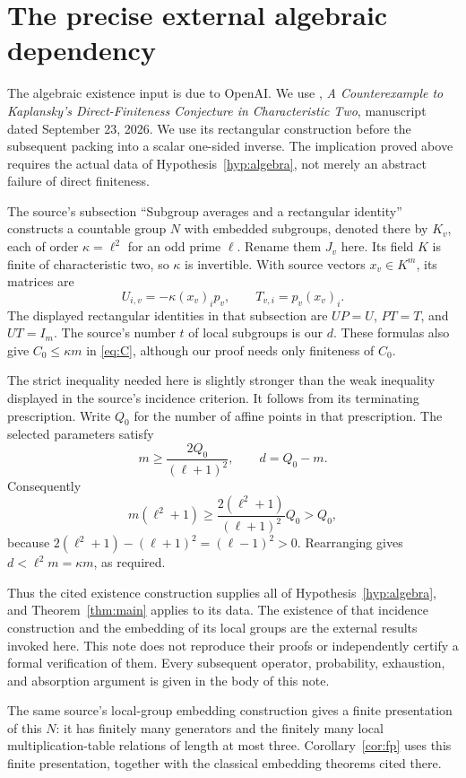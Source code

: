 \documentclass[11pt,a4paper]{article}
\numberwithin{equation}{section}
\begin{document}
\appendix
\section{The precise external algebraic dependency}\label{sec:source}

The algebraic existence input is due to OpenAI. We use \cite{OAI},
\emph{A Counterexample to Kaplansky's Direct-Finiteness Conjecture in
Characteristic Two}, manuscript dated September 23, 2026. We use its
rectangular construction before the subsequent packing into a scalar
one-sided inverse. The implication proved above requires the actual
data of Hypothesis~\ref{hyp:algebra}, not merely an abstract failure of
direct finiteness.

The source's subsection ``Subgroup averages and a rectangular identity''
constructs a countable group $N$ with embedded subgroups, denoted there
by $K_v$, each of order $\kappa=\ell^2$ for an odd prime $\ell$.
Rename them $J_v$ here. Its field $K$ is finite of characteristic two,
so $\kappa$ is invertible. With source vectors $x_v\in K^m$, its matrices
are
\[
 U_{i,v}=-\kappa(x_v)_i p_v,
 \qquad T_{v,i}=p_v(x_v)_i.
\]
The displayed rectangular identities in that subsection are
$UP=U$, $PT=T$, and $UT=I_m$. The source's number $t$ of local subgroups
is our $d$. These formulas also give $C_0\leq\kappa m$ in
\eqref{eq:C}, although our proof needs only finiteness of $C_0$.

The strict inequality needed here is slightly stronger than the weak
inequality displayed in the source's incidence criterion. It follows
from its terminating prescription. Write $Q_0$ for the number of affine
points in that prescription. The selected parameters satisfy
\[
 m\geq\frac{2Q_0}{(\ell+1)^2},\qquad d=Q_0-m.
\]
Consequently
\[
 m(\ell^2+1)
 \geq \frac{2(\ell^2+1)}{(\ell+1)^2}Q_0
 >Q_0,
\]
because
$2(\ell^2+1)-(\ell+1)^2=(\ell-1)^2>0$.
Rearranging gives $d<\ell^2m=\kappa m$, as required.

Thus the cited existence construction supplies all of
Hypothesis~\ref{hyp:algebra}, and Theorem~\ref{thm:main} applies to its
data. The existence of that incidence construction and the embedding
of its local groups are the external results invoked here. This note
does not reproduce their proofs or independently certify a formal
verification of them. Every subsequent operator, probability,
exhaustion, and absorption argument is given in the body of this note.

The same source's local-group embedding construction gives a finite
presentation of this $N$: it has finitely many generators and the finitely
many local multiplication-table relations of length at most three.
Corollary~\ref{cor:fp} uses this finite presentation, together with the
classical embedding theorems cited there.
\end{document}
